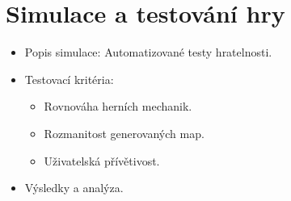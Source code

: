 \section{Simulace a testování hry}
\begin{itemize}
    \item Popis simulace: Automatizované testy hratelnosti.
    \item Testovací kritéria:
    \begin{itemize}
        \item Rovnováha herních mechanik.
        \item Rozmanitost generovaných map.
        \item Uživatelská přívětivost.
    \end{itemize}
    \item Výsledky a analýza.
\end{itemize}